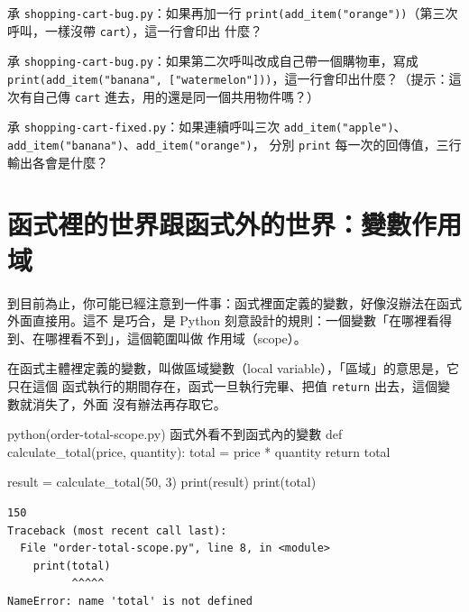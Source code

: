 
\begin{drills}[label=drills:mutable-default]
\item 承 \texttt{shopping-cart-bug.py}：如果再加一行
\texttt{print(add\_item("orange"))}（第三次呼叫，一樣沒帶 \texttt{cart}），這一行會印出
什麼？
\item 承 \texttt{shopping-cart-bug.py}：如果第二次呼叫改成自己帶一個購物車，寫成
\texttt{print(add\_item("banana", ["watermelon"]))}，這一行會印出什麼？（提示：這次有自己傳
\texttt{cart} 進去，用的還是同一個共用物件嗎？）
\item 承 \texttt{shopping-cart-fixed.py}：如果連續呼叫三次
\texttt{add\_item("apple")}、\texttt{add\_item("banana")}、\texttt{add\_item("orange")}，
分別 \texttt{print} 每一次的回傳值，三行輸出各會是什麼？
\end{drills}

\section{函式裡的世界跟函式外的世界：變數作用域}
\label{sec:function-scope}

到目前為止，你可能已經注意到一件事：函式裡面定義的變數，好像沒辦法在函式外面直接用。這不
是巧合，是 Python 刻意設計的規則：一個變數「在哪裡看得到、在哪裡看不到」，這個範圍叫做
作用域（scope）。

在函式主體裡定義的變數，叫做區域變數（local variable），「區域」的意思是，它只在這個
函式執行的期間存在，函式一旦執行完畢、把值 \texttt{return} 出去，這個變數就消失了，外面
沒有辦法再存取它。

\begin{example}{python}{(order-total-scope.py) 函式外看不到函式內的變數}
def calculate_total(price, quantity):
    total = price * quantity
    return total


result = calculate_total(50, 3)
print(result)
print(total)
\end{example}

\begin{verbatim}
150
Traceback (most recent call last):
  File "order-total-scope.py", line 8, in <module>
    print(total)
          ^^^^^
NameError: name 'total' is not defined
\end{verbatim}

